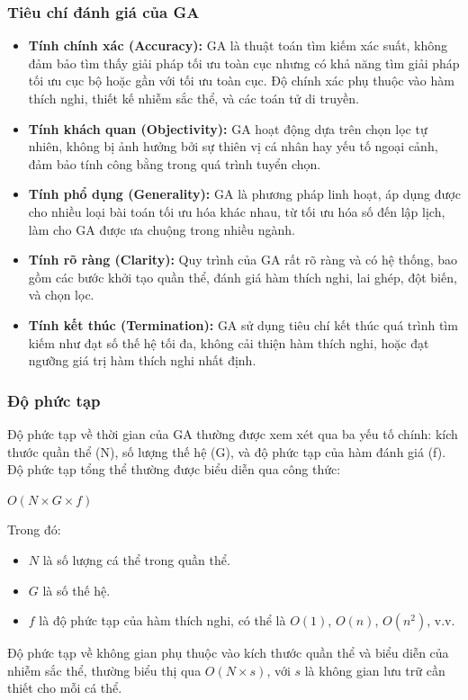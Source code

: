 \documentclass[14pt]{article}
\begin{document}
	\subsubsection{Tiêu chí đánh giá của GA}
	\begin{itemize}
		\item \textbf{Tính chính xác (Accuracy):} GA là thuật toán tìm kiếm xác suất, không đảm bảo tìm thấy giải pháp tối ưu toàn cục nhưng có khả năng tìm giải pháp tối ưu cục bộ hoặc gần với tối ưu toàn cục. Độ chính xác phụ thuộc vào hàm thích nghi, thiết kế nhiễm sắc thể, và các toán tử di truyền.
		\item \textbf{Tính khách quan (Objectivity):} GA hoạt động dựa trên chọn lọc tự nhiên, không bị ảnh hưởng bởi sự thiên vị cá nhân hay yếu tố ngoại cảnh, đảm bảo tính công bằng trong quá trình tuyển chọn.
		\item \textbf{Tính phổ dụng (Generality):} GA là phương pháp linh hoạt, áp dụng được cho nhiều loại bài toán tối ưu hóa khác nhau, từ tối ưu hóa số đến lập lịch, làm cho GA được ưa chuộng trong nhiều ngành.
		\item \textbf{Tính rõ ràng (Clarity):} Quy trình của GA rất rõ ràng và có hệ thống, bao gồm các bước khởi tạo quần thể, đánh giá hàm thích nghi, lai ghép, đột biến, và chọn lọc.
		\item \textbf{Tính kết thúc (Termination):} GA sử dụng tiêu chí kết thúc quá trình tìm kiếm như đạt số thế hệ tối đa, không cải thiện hàm thích nghi, hoặc đạt ngưỡng giá trị hàm thích nghi nhất định.
	\end{itemize}
	
	\subsubsection{Độ phức tạp}
	Độ phức tạp về thời gian của GA thường được xem xét qua ba yếu tố chính: kích thước quần thể (N), số lượng thế hệ (G), và độ phức tạp của hàm đánh giá (f). Độ phức tạp tổng thể thường được biểu diễn qua công thức:
	\begin{center}
	 \(O(N \times G \times f)\)
	\end{center}

	\begin{flushleft}
	Trong đó:
	\end{flushleft}
	 
	\begin{itemize}
		\item \(N\) là số lượng cá thể trong quần thể.
		\item \(G\) là số thế hệ.
		\item \(f\) là độ phức tạp của hàm thích nghi, có thể là \(O(1)\), \(O(n)\), \(O(n^2)\), v.v.
	\end{itemize}
	Độ phức tạp về không gian phụ thuộc vào kích thước quần thể và biểu diễn của nhiễm sắc thể, thường biểu thị qua \(O(N \times s)\), với \(s\) là không gian lưu trữ cần thiết cho mỗi cá thể.
\end{document}
